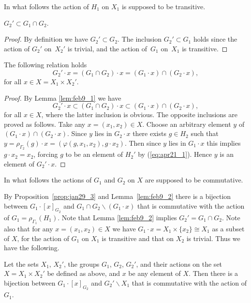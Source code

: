 In what follows the action of $H_1$ on $X_1$ is supposed to be transitive.
\begin{lemma}\label{lem:feb9_1}
$G_2' \subset G_1 \cap G_2$.
\end{lemma}

\begin{proof}
By def\/inition we have $G_2' \subset G_2$.
The inclusion $G_2' \subset G_1$ holds since the action of $G_2'$
on~$X_2'$ is trivial, and the action of~$G_1$ on~$X_1$ is transitive.
\end{proof}

\begin{lemma}\label{lem:feb9_2}
The following relation holds
\begin{displaymath}
G_2' \cdot x = (G_1 \cap G_2) \cdot x =
(G_1 \cdot x) \cap (G_2 \cdot x),
\end{displaymath}
for all $x \in X= X_1 \times X_2'$.
\end{lemma}
\begin{proof}
By Lemma \ref{lem:feb9_1} we have
\begin{displaymath}
G_2' \cdot x \subset (G_1 \cap G_2) \cdot x \subset
(G_1 \cdot x) \cap (G_2 \cdot x),
\end{displaymath}
for all $x \in X$,
where the latter inclusion is obvious.
The opposite inclusions are proved as follows.
Take any $x = (x_1, x_2) \in X$.
Choose an arbitrary element $y$ of $(G_1 \cdot x) \cap (G_2 \cdot x)$.
Since $y$ lies in $G_2 \cdot x$ there exists $g \in H_2$ such that
$y = \rho_{\varGamma_2} (g) \cdot x = (\varphi (g, x_1,x_2), g \cdot x_2)$.
Then since $y$ lies in $G_1 \cdot x$ this implies $g \cdot x_2 = x_2$, forcing
$g$ to be an element of $H_2'$ by (\ref{eq:apr21_1}).
Hence $y$ is an element of $G_2' \cdot x$.
\end{proof}

In what follows the actions of $G_1$ and $G_2$ on $X$ are supposed to be commutative.

By Proposition~\ref{prop:jan29_3} and Lemma~\ref{lem:feb9_2}
there is a bijection between $G_1 \cdot [x]_{G_2}$ and $G_1 \cap G_2 \backslash (G_1 \cdot x)$
that is commutative with the action of $G_1= \rho_{\varGamma_1} (H_1)$.
Note that Lemma \ref{lem:feb9_2} implies $G_2' = G_1 \cap G_2$.
Note also that for any $x =(x_1,x_2) \in X$ we have
$G_1 \cdot x = X_1 \times \{ x_2 \} \cong X_1$ as a subset of $X$, for
the action of $G_1$ on $X_1$ is transitive and that on $X_2$ is trivial.
Thus we have the following.

\begin{theorem}\label{th:apr10_1}
Let the sets $X_1$, $X_2'$,
the groups $G_1$, $G_2$, $G_2'$, and their actions on the set $X= X_1 \times X_2'$ be defined as above, and $x$ be any element of $X$.
Then there is a bijection between $G_1 \cdot [x]_{G_2}$ and $G_2' \backslash X_1$ that is commutative with the action of $G_1$.
\end{theorem}


